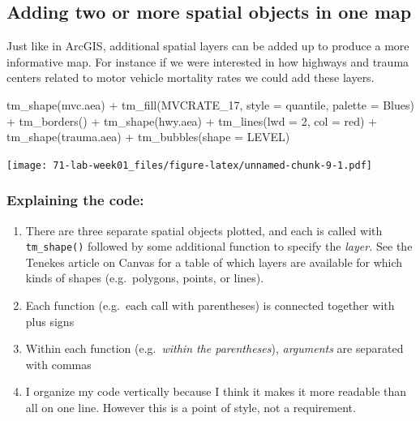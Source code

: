 \documentclass[
]{book}
\newenvironment{Shaded}{\begin{snugshade}}{\end{snugshade}}
\newcommand{\AttributeTok}[1]{\textcolor[rgb]{0.77,0.63,0.00}{#1}}
\newcommand{\DecValTok}[1]{\textcolor[rgb]{0.00,0.00,0.81}{#1}}
\newcommand{\FunctionTok}[1]{\textcolor[rgb]{0.00,0.00,0.00}{#1}}
\newcommand{\NormalTok}[1]{#1}
\newcommand{\SpecialCharTok}[1]{\textcolor[rgb]{0.00,0.00,0.00}{#1}}
\newcommand{\StringTok}[1]{\textcolor[rgb]{0.31,0.60,0.02}{#1}}
\providecommand{\tightlist}{%
  \setlength{\itemsep}{0pt}\setlength{\parskip}{0pt}}
\begin{document}
\hypertarget{adding-two-or-more-spatial-objects-in-one-map-1}{%
\subsection{Adding two or more spatial objects in one map}\label{adding-two-or-more-spatial-objects-in-one-map-1}}

Just like in ArcGIS, additional spatial layers can be added up to produce a more informative map. For instance if we were interested in how highways and trauma centers related to motor vehicle mortality rates we could add these layers.

\begin{Shaded}
\begin{Highlighting}[]
\FunctionTok{tm\_shape}\NormalTok{(mvc.aea) }\SpecialCharTok{+} 
  \FunctionTok{tm\_fill}\NormalTok{(}\StringTok{\textquotesingle{}MVCRATE\_17\textquotesingle{}}\NormalTok{,}
          \AttributeTok{style =} \StringTok{\textquotesingle{}quantile\textquotesingle{}}\NormalTok{,}
          \AttributeTok{palette =} \StringTok{\textquotesingle{}Blues\textquotesingle{}}\NormalTok{) }\SpecialCharTok{+}
  \FunctionTok{tm\_borders}\NormalTok{() }\SpecialCharTok{+}
\FunctionTok{tm\_shape}\NormalTok{(hwy.aea) }\SpecialCharTok{+} 
  \FunctionTok{tm\_lines}\NormalTok{(}\AttributeTok{lwd =} \DecValTok{2}\NormalTok{, }\AttributeTok{col =} \StringTok{\textquotesingle{}red\textquotesingle{}}\NormalTok{) }\SpecialCharTok{+}
\FunctionTok{tm\_shape}\NormalTok{(trauma.aea) }\SpecialCharTok{+} 
  \FunctionTok{tm\_bubbles}\NormalTok{(}\AttributeTok{shape =} \StringTok{\textquotesingle{}LEVEL\textquotesingle{}}\NormalTok{)}
\end{Highlighting}
\end{Shaded}

\texttt{[image: 71-lab-week01\_files/figure-latex/unnamed-chunk-9-1.pdf]}

\hypertarget{explaining-the-code}{%
\subsubsection{Explaining the code:}\label{explaining-the-code}}

\begin{enumerate}
\def\labelenumi{\arabic{enumi}.}
\tightlist
\item
  There are three separate spatial objects plotted, and each is called with \texttt{tm\_shape()} followed by some additional function to specify the \emph{layer.} See the Tenekes article on Canvas for a table of which layers are available for which kinds of shapes (e.g.~polygons, points, or lines).
\item
  Each function (e.g.~each call with parentheses) is connected together with plus signs
\item
  Within each function (e.g.~\emph{within the parentheses}), \emph{arguments} are separated with commas
\item
  I organize my code vertically because I think it makes it more readable than all on one line. However this is a point of style, not a requirement.
\end{enumerate}
\end{document}
